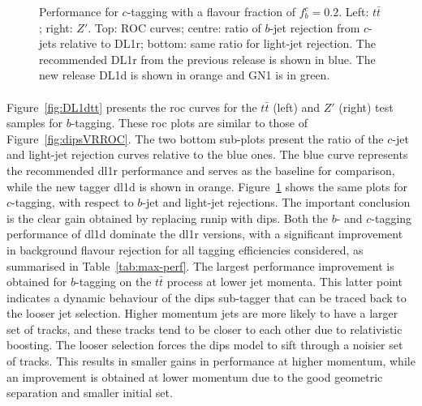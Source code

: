 \begin{figure}[h!]
{  }
  \caption{Performance for $c$-tagging with a flavour fraction of $f^c_b = 0.2$. Left: $t\bar{t}$; right: $Z'$. Top: ROC curves; centre: ratio of $b$-jet rejection from $c$-jets relative to DL1r; bottom: same ratio for light-jet rejection. The recommended DL1r from the previous release is shown in blue. The new release DL1d is shown in orange and GN1 is in green.}
  \label{fig:DL1dz}
\end{figure}
\vspace*{\fill}

\clearpage

\paragraph{}Figure~\ref{fig:DL1dtt} presents the \gls{roc} curves for the $t\bar{t}$ (left) and $Z'$ (right) test samples for $b$-tagging. These \gls{roc} plots are similar to those of Figure~\ref{fig:dipsVRROC}. The two bottom sub-plots present the ratio of the $c$-jet and light-jet rejection curves relative to the blue ones. The blue curve represents the recommended \gls{dl1r} performance and serves as the baseline for comparison, while the new tagger \gls{dl1d} is shown in orange. Figure~\ref{fig:DL1dz} shows the same plots for $c$-tagging, with respect to $b$-jet and light-jet rejections. The important conclusion is the clear gain obtained by replacing \gls{rnnip} with \gls{dips}. Both the $b$- and $c$-tagging performance of \gls{dl1d} dominate the \gls{dl1r} versions, with a significant improvement in background flavour rejection for all tagging efficiencies considered, as summarised in Table~\ref{tab:max-perf}. The largest performance improvement is obtained for $b$-tagging on the $t\bar{t}$ process at lower jet momenta. This latter point indicates a dynamic behaviour of the \gls{dips} sub-tagger that can be traced back to the looser jet selection. Higher momentum jets are more likely to have a larger set of tracks, and these tracks tend to be closer to each other due to relativistic boosting. The looser selection forces the \gls{dips} model to sift through a noisier set of tracks. This results in smaller gains in performance at higher momentum, while an improvement is obtained at lower momentum due to the good geometric separation and smaller initial set.  \\


